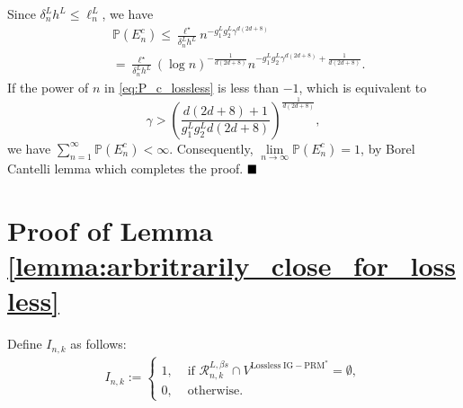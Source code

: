 \documentclass[Afour,sageh,times]{sagej}
\renewcommand{\qed}{\hfill\blacksquare}
\begin{document}
Since $\delta^L_n h^L\leq\ell^L_n$, we have
\begin{align} \nonumber
    &\mathbb{P}\left(E^c_{n}\right)
    \leq \frac{\ell^\star}{\delta^L_n h^L}  n^{- g^L_1 g^L_2 \gamma^{d(2d+8)}}  \\ \label{eq:P_c_lossless} 
     &= \frac{ \ell^\star}{\delta^L_n h^L} (\log n)^{-\frac{1}{d(2d+8)}} n^{- g^L_1 g^L_2 \gamma^{d(2d+8)}+ \frac{1}{d(2d+8)}}. 
\end{align}
If the power of $n$ in \eqref{eq:P_c_lossless} is less than $-1$, which is equivalent to
\[
\gamma>\left(\frac{d(2d+8)+1}{g^L_1 g^L_2 d(2d+8)} \right)^\frac{1}{d(2d+8)},
\]
we have $\sum_{n=1}^\infty  \mathbb{P}\left(E^c_{n}\right)<\infty$. Consequently, 
$\underset{n\rightarrow\infty}{\lim}\mathbb{P}\left(E^c_{n}\right)=1$,
by Borel Cantelli lemma \cite{grimmett2020probability} which completes the proof. $\qed$

\section{Proof of Lemma \ref{lemma:arbritrarily_close_for_lossless}\label{appendix:arbitr_close_lossless}}
Define $I_{n,k}$ as follows:
\begin{align}
    I_{n, k}:= \begin{cases}1, & \text { if }\mathcal{R}^{L,\beta s}_{n,k} \cap V^{\mathrm{Lossless \;IG-PRM}^{*}}=\emptyset, \\ 0, & \text { otherwise. }\end{cases}\nonumber
\end{align}
\end{document}
